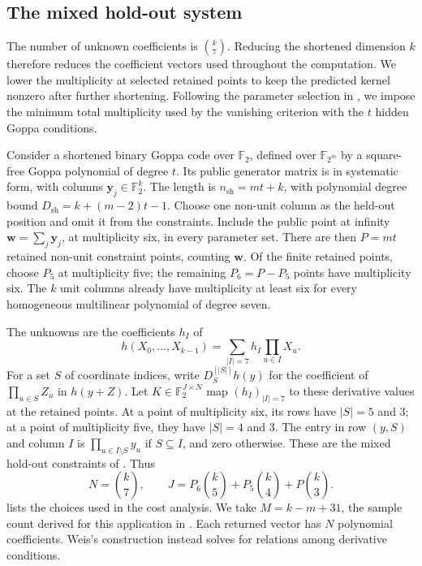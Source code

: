 \documentclass[b5paper, 10pt, abstract=true, captions=tableheading]{scrartcl}
\theoremstyle{plain}
\theoremstyle{definition}
\newcommand{\FF}{\mathds{F}}
\begin{document}
\providecommand{\ceil}[1]{\left\lceil #1\right\rceil}
\providecommand{\Cfive}{\binom{k}{5}}
\providecommand{\Cthree}{\binom{k}{3}}
\providecommand{\rhoo}[1]{\rho\!\left(#1\right)}
\subsection{The mixed hold-out system}
\label{sec:wopt-parameters}
The number of unknown coefficients is $\binom{k}{7}$. Reducing the
shortened dimension $k$ therefore reduces the coefficient vectors used
throughout the computation.
We lower the multiplicity at selected retained points to keep the
predicted kernel nonzero after further shortening. Following the
parameter selection in \cite[Sec.~9]{Vedenev2026KeyRecovery}, we impose
the minimum total multiplicity used by the vanishing criterion with the
$t$ hidden Goppa conditions.

Consider a shortened binary Goppa code over $\FF_2$, defined over
$\FF_{2^m}$ by a square-free Goppa polynomial of degree $t$. Its public
generator matrix is in systematic form, with columns
$\mathbf y_j\in\FF_2^k$. The length is
\(n_{\mathrm{sh}}=mt+k\), with polynomial degree bound
\(D_{\mathrm{sh}}=k+(m-2)t-1\). Choose one non-unit column as the held-out
position and omit it from the constraints. Include the public point at
infinity
\(\mathbf w=\sum_j\mathbf y_j\), at multiplicity six, in every parameter
set. There are then \(P=mt\) retained non-unit constraint points, counting
\(\mathbf w\). Of the finite retained points, choose \(P_5\) at
multiplicity five; the remaining \(P_6=P-P_5\) points have multiplicity six.
The \(k\) unit columns already have multiplicity at least six for every
homogeneous multilinear polynomial of degree seven.

The unknowns are the coefficients $h_I$ of
\[
 h(X_0,\ldots,X_{k-1})=\sum_{|I|=7}h_I\prod_{u\in I}X_u.
\]
For a set $S$ of coordinate indices, write $D_S^{[|S|]}h(y)$ for the
coefficient of $\prod_{u\in S}Z_u$ in $h(y+Z)$.
Let \(K\in\FF_2^{J\times N}\) map $(h_I)_{|I|=7}$ to these derivative
values at the retained points. At a point of multiplicity six, its rows
have $|S|=5$ and $3$; at a point of multiplicity five, they have $|S|=4$
and $3$. The entry in row $(y,S)$ and column $I$ is
$\prod_{u\in I\setminus S}y_u$ if $S\subseteq I$, and zero otherwise.
These are the mixed hold-out constraints of
\cite[Sec.~9.2]{Vedenev2026KeyRecovery}. Thus
\begin{equation}
 N=\binom{k}{7},\qquad
 J=P_6\binom{k}{5}+P_5\binom{k}{4}+P\binom{k}{3}.
 \label{eq:wopt-dimensions}
\end{equation}
 lists the choices used in the cost analysis.
We take $M=k-m+31$, the sample count derived for this application in
\cite[Sec.~9.1]{Vedenev2026KeyRecovery}. Each returned vector has $N$
polynomial coefficients. Weis's construction instead solves for relations
among derivative conditions.
\end{document}
